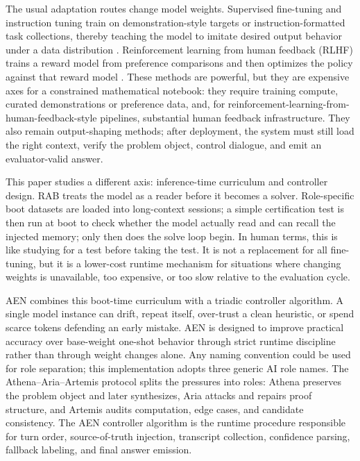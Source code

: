 \documentclass[11pt]{article}
\newcommand{\systemname}{AEN}
\newcommand{\athena}{Athena}
\newcommand{\aria}{Aria}
\newcommand{\artemis}{Artemis}
\newcommand{\rab}{RAB}
\begin{document}
The usual adaptation routes change model weights. Supervised fine-tuning and instruction tuning train on demonstration-style targets or instruction-formatted task collections, thereby teaching the model to imitate desired output behavior under a data distribution \citep{wei2021finetuned,ouyang2022training}. Reinforcement learning from human feedback (RLHF) trains a reward model from preference comparisons and then optimizes the policy against that reward model \citep{christiano2017deep,ouyang2022training}. These methods are powerful, but they are expensive axes for a constrained mathematical notebook: they require training compute, curated demonstrations or preference data, and, for reinforcement-learning-from-human-feedback-style pipelines, substantial human feedback infrastructure. They also remain output-shaping methods; after deployment, the system must still load the right context, verify the problem object, control dialogue, and emit an evaluator-valid answer.

This paper studies a different axis: inference-time curriculum and controller design. \rab{} treats the model as a reader before it becomes a solver. Role-specific boot datasets are loaded into long-context sessions; a simple certification test is then run at boot to check whether the model actually read and can recall the injected memory; only then does the solve loop begin. In human terms, this is like studying for a test before taking the test. It is not a replacement for all fine-tuning, but it is a lower-cost runtime mechanism for situations where changing weights is unavailable, too expensive, or too slow relative to the evaluation cycle.

\systemname{} combines this boot-time curriculum with a triadic controller algorithm. A single model instance can drift, repeat itself, over-trust a clean heuristic, or spend scarce tokens defending an early mistake. AEN is designed to improve practical accuracy over base-weight one-shot behavior through strict runtime discipline rather than through weight changes alone. Any naming convention could be used for role separation; this implementation adopts three generic AI role names. The \athena{}--\aria{}--\artemis{} protocol splits the pressures into roles: \athena{} preserves the problem object and later synthesizes, \aria{} attacks and repairs proof structure, and \artemis{} audits computation, edge cases, and candidate consistency. The AEN controller algorithm is the runtime procedure responsible for turn order, source-of-truth injection, transcript collection, confidence parsing, fallback labeling, and final answer emission.
\end{document}

